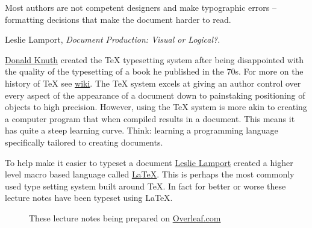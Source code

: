 
\epigraph{Most authors are not competent designers and make typographic errors -- formatting decisions that make the document harder to read.}{Leslie Lamport, \emph{Document Production: Visual or Logical?}. }

\minitoc



\href{https://www-cs-faculty.stanford.edu/~knuth/}{Donald Knuth} created the \TeX{} typesetting system after being disappointed with the quality of the typesetting of a book he published in the 70s. For more on the history of \TeX{} see \href{https://en.wikipedia.org/wiki/TeX}{wiki}. The \TeX{} system excels at giving an author control over every aspect of the appearance of a document down to painstaking  positioning of objects to high precision. However, using the \TeX{} system is more akin to creating a computer program that when compiled results in a document. This means it has quite a steep learning curve. Think: learning a programming language specifically tailored to creating documents.

To help make it easier to typeset a document \href{http://www.lamport.org}{Leslie Lamport} created a higher level macro based language called \href{https://en.wikipedia.org/wiki/LaTeX}{\LaTeX{}}. This is perhaps the most commonly used type setting system  built around \TeX{}. In fact for better or worse these lecture notes have been typeset using \LaTeX{}. 

\begin{figure}[htbp!]
    \centering
    \caption{These lecture notes being prepared on \href{http://overleaf.com}{Overleaf.com}}
    \label{overleafNotes.fig}
\end{figure}

